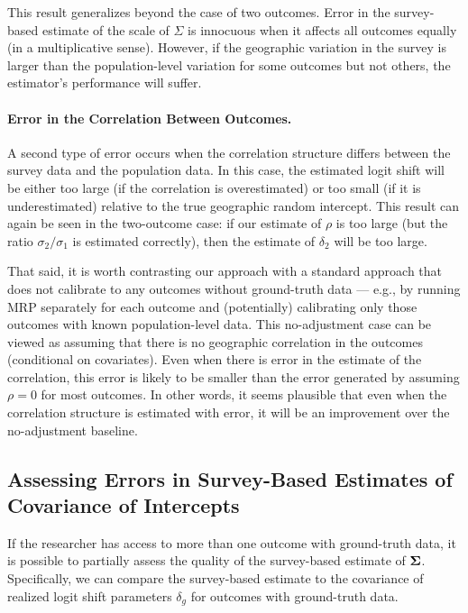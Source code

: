 This result generalizes beyond the case of two outcomes. Error in the survey-based estimate of the scale of $\Sigma$ is innocuous when it affects all outcomes equally (in a multiplicative sense). However, if the geographic variation in the survey is larger than the population-level variation for some outcomes but not others, the estimator's performance will suffer.


\paragraph{Error in the Correlation Between Outcomes.} A second type of error occurs when the correlation structure differs between the survey data and the population data. In this case, the estimated logit shift will be either too large (if the correlation is overestimated) or too small (if it is underestimated) relative to the true geographic random intercept. This result can again be seen in the two-outcome case: if our estimate of $\rho$ is too large (but the ratio $\sigma_2 / \sigma_1$  is estimated correctly), then the estimate of $\delta_2$ will be too large. 

That said, it is worth contrasting our approach with a standard approach that does not calibrate to any outcomes without ground-truth data --- e.g., by running MRP separately for each outcome and (potentially) calibrating only those outcomes with known population-level data. This no-adjustment case can be viewed as  assuming that there is no geographic correlation in the outcomes (conditional on covariates). Even when there is error in the estimate of the correlation, this error is likely to be smaller than the error generated by assuming $\rho = 0$ for most outcomes. In other words, it seems plausible that even when the correlation structure is estimated with error, it will be an improvement over the no-adjustment baseline.


\subsection{Assessing Errors in Survey-Based Estimates of Covariance of Intercepts}

If the researcher has access to more than one outcome with ground-truth data, it is possible to partially assess the quality of the survey-based estimate of $\mathbf{\Sigma}$. Specifically, we can compare the survey-based estimate to the covariance of realized logit shift parameters $\delta_g$ for outcomes with ground-truth data.  

